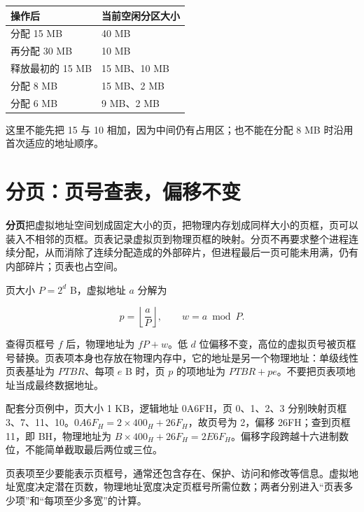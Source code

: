 \begin{wideblock}

\par\medskip\noindent\begin{minipage}{\linewidth}\fontsize{9.3}{12}\selectfont\begin{tabularx}{\linewidth}{@{}YY@{}}
\toprule\noalign{}
操作后 & 当前空闲分区大小 \\
\midrule\noalign{}


分配 15 MB & 40 MB \\
再分配 30 MB & 10 MB \\
释放最初的 15 MB & 15 MB、10 MB \\
分配 8 MB & 15 MB、2 MB \\
分配 6 MB & 9 MB、2 MB \\
\bottomrule\end{tabularx}
\end{minipage}\par\medskip

\end{wideblock}

这里不能先把 15 与 10 相加，因为中间仍有占用区；也不能在分配 8 MB 时沿用首次适应的地址顺序。

\section{分页：页号查表，偏移不变}\label{OS03-5-4}

\textbf{分页}把虚拟地址空间划成固定大小的页，把物理内存划成同样大小的页框，页可以装入不相邻的页框。页表记录虚拟页到物理页框的映射。分页不再要求整个进程连续分配，从而消除了连续分配造成的外部碎片，但进程最后一页可能未用满，仍有内部碎片；页表也占空间。

页大小 \(P=2^d\) B，虚拟地址 \(a\) 分解为

\[p=\left\lfloor\frac aP\right\rfloor,\qquad w=a\bmod P.\]

查得页框号 \(f\) 后，物理地址为 \(fP+w\)。低 \(d\) 位偏移不变，高位的虚拟页号被页框号替换。页表项本身也存放在物理内存中，它的地址是另一个物理地址：单级线性页表基址为 \(PTBR\)、每项 \(e\) B 时，页 \(p\) 的项地址为 \(PTBR+pe\)。不要把页表项地址当成最终数据地址。

配套分页例中，页大小 1 KB，逻辑地址 0A6FH，页 0、1、2、3 分别映射页框 3、7、11、10。\(0A6F_H=2\times400_H+26F_H\)，故页号为 2，偏移 26FH；查到页框 11，即 BH，物理地址为 \(B\times400_H+26F_H=2E6F_H\)。偏移字段跨越十六进制数位，不能简单截取最后两位或三位。

页表项至少要能表示页框号，通常还包含存在、保护、访问和修改等信息。虚拟地址宽度决定潜在页数，物理地址宽度决定页框号所需位数；两者分别进入``页表多少项''和``每项至少多宽''的计算。

